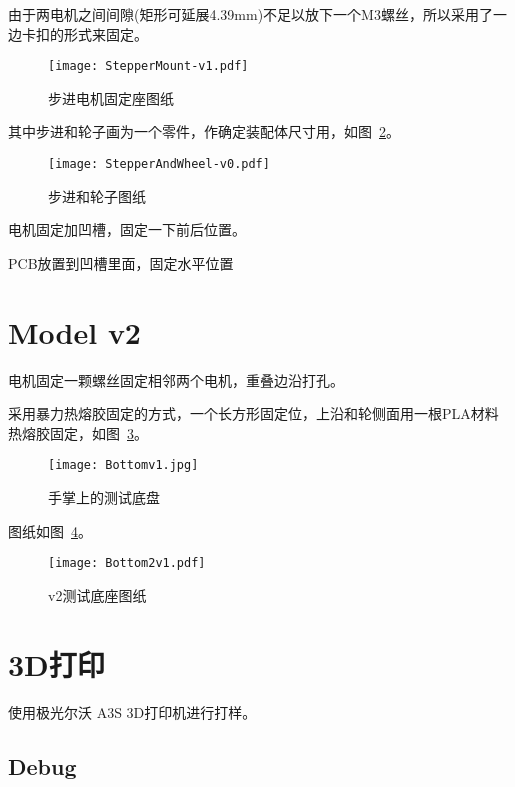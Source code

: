 由于两电机之间间隙(矩形可延展4.39mm)不足以放下一个M3螺丝，所以采用了一边卡扣的形式来固定。

\begin{figure}[htbp]
    \centering
    \texttt{[image: StepperMount-v1.pdf]}
    \caption{步进电机固定座图纸}
    \label{fig:StepperMount-v1-Datasheet}
\end{figure}

其中步进和轮子画为一个零件，作确定装配体尺寸用，如图~\ref{fig:StepperAndWheel-v0-Datasheet}。

\begin{figure}[htbp]
    \centering
    \texttt{[image: StepperAndWheel-v0.pdf]}
    \caption{步进和轮子图纸}
    \label{fig:StepperAndWheel-v0-Datasheet}
\end{figure}


电机固定加凹槽，固定一下前后位置。

PCB放置到凹槽里面，固定水平位置


\section{Model v2}

电机固定一颗螺丝固定相邻两个电机，重叠边沿打孔。

采用暴力热熔胶固定的方式，一个长方形固定位，上沿和轮侧面用一根PLA材料热熔胶固定，如图~\ref{fig:Bottomv1}。

\begin{figure}[htbp]
    \centering
    \texttt{[image: Bottomv1.jpg]}
    \caption{手掌上的测试底盘}
    \label{fig:Bottomv1}
\end{figure}

图纸如图~\ref{fig:Bottom2v1}。

\begin{figure}[htbp]
    \centering
    \texttt{[image: Bottom2v1.pdf]}
    \caption{v2测试底座图纸}
    \label{fig:Bottom2v1}
\end{figure}



\section{3D打印}

使用极光尔沃 A3S 3D打印机进行打样。

\subsection{Debug}

